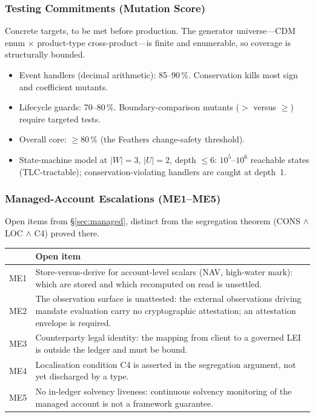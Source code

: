 \documentclass[11pt,a4paper]{article}
\begin{document}
\subsubsection{Testing Commitments (Mutation Score)}

Concrete targets, to be met before production. The generator universe---CDM enum $\times$ product-type cross-product---is finite and enumerable, so coverage is structurally bounded.

\begin{itemize}[nosep]
\item Event handlers (decimal arithmetic): 85--90\,\%. Conservation kills most sign and coefficient mutants.
\item Lifecycle guards: 70--80\,\%. Boundary-comparison mutants ($>$ versus $\geq$) require targeted tests.
\item Overall core: $\geq 80\,\%$ (the Feathers change-safety threshold).
\item State-machine model at $|W|=3$, $|U|=2$, depth $\leq 6$: $10^5$--$10^6$ reachable states (TLC-tractable); conservation-violating handlers are caught at depth~1.
\end{itemize}

\subsubsection{Managed-Account Escalations (ME1--ME5)}

Open items from \S\ref{sec:managed}, distinct from the segregation theorem (CONS $\wedge$ LOC $\wedge$ C4) proved there.

\begin{longtable}{@{}p{0.5cm}p{12.6cm}@{}}
\toprule
& \textbf{Open item} \\
\midrule
\endhead
ME1 & Store-versus-derive for account-level scalars (NAV, high-water mark): which are stored and which recomputed on read is unsettled. \\
ME2 & The observation surface is unattested: the external observations driving mandate evaluation carry no cryptographic attestation; an attestation envelope is required. \\
ME3 & Counterparty legal identity: the mapping from client to a governed LEI is outside the ledger and must be bound. \\
ME4 & Localisation condition C4 is asserted in the segregation argument, not yet discharged by a type. \\
ME5 & No in-ledger solvency liveness: continuous solvency monitoring of the managed account is not a framework guarantee. \\
\bottomrule
\end{longtable}
\end{document}

